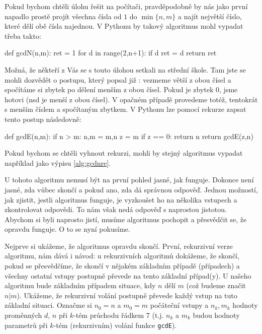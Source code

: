 Pokud bychom chtěli úlohu řešit na počítači, pravděpodobně by nás jako první napadlo prostě
projít všechna čísla od $1$ do $\min \{n,m\}$ a najít největší číslo, které dělí obě čísla najednou.
V Pythonu by takový algoritmus mohl vypadat třeba takto:

\begin{python}
def gcdN(n,m):
    ret = 1
    for d in range(2,n+1):
        if d %
            ret = d
    return ret
\end{python}

Možná, že někteří z Vás se s touto úlohou setkali na střední škole. Tam jste se mohli dozvědět o postupu, který 
popsal již : vezmeme větší z obou čísel a spočítáme si zbytek po dělení menším z obou čísel. Pokud je
zbytek 0, jsme hotovi (nsd je menší z obou čísel). V opačném případě provedeme totéž, tentokrát s menším číslem 
a spočítaným zbytkem. V Pythonu lze pomocí rekurze zapsat tento postup následovně:

\begin{python}
def gcdE(n,m):
    if n > m:
        n,m = m,n
    z = m %
    if z == 0:
        return n
    return gcdE(z,n)
\end{python}

Pokud bychom se chtěli vyhnout rekurzi, mohli by stejný algoritmus vypadat
například jako výpisu \ref{alg:gcdnre}.


U tohoto algoritmu nemusí být na první pohled jasné, jak funguje. Dokonce není jasné, zda vůbec skončí a pokud ano, zda
dá správnou odpověď.  Jednou možností, jak zjistit, jestli algoritmus funguje, je vyzkoušet ho na několika vstupech a 
zkontrolovat odpovědi. To nám však nedá odpověď s naprostou jistotou.  Abychom si byli naprosto jistí, musíme
algoritmus pochopit a přesvědčit se, že opravdu funguje. O to se nyní pokusíme. 

Nejprve si ukážeme, že
algoritmus opravdu skončí.  První, rekurzivní verze algoritmu, nám dává i návod: u rekurzivních algoritmů dokážeme,
že skončí, pokud se přesvědčíme, že skončí v nějakém základním případě (případech) a všechny ostatní vstupy postupně převede
na tento základní případ(y).  U našeho algoritmu bude základním případem situace, kdy $n$ dělí $m$ (což budeme značit $n|m$).  Ukážeme, že rekurzivní volání
postupně převede každý vstup na tuto základní situaci. Označme si $n_0 = n$ a $m_0=m$ počáteční vstupy a $n_k, m_k$ hodnoty proměnných 
$d$, $n$ při $k$-tém průchodu řádkem 7 (t.j. $n_k$ a $m_k$ budou hodnoty parametrů při $k$-tém (rekurzivním) volání funkce {\tt gcdE}).

